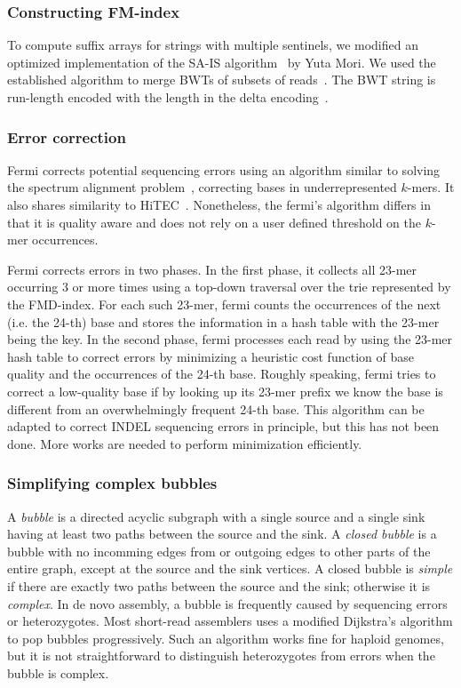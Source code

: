 \documentclass{bioinfo}
\begin{document}
\begin{methods}
\subsubsection{Constructing FM-index}
To compute suffix arrays for strings with multiple sentinels, we modified an
optimized implementation of the SA-IS algorithm~\citep{DBLP:journals/tc/NongZC11} by Yuta
Mori.  We used the established algorithm to merge BWTs of subsets of
reads~\citep{DBLP:journals/algorithmica/HonLSSY07,en:2009fk,DBLP:conf/latin/FerraginaGM10}.
The BWT string is run-length encoded with the length in the delta
encoding~\citep{Elias:1975ly}.

\subsubsection{Error correction}
Fermi corrects potential sequencing errors using an algorithm similar to
solving the spectrum alignment problem~\citep{Pevzner:2001vn}, correcting
bases in underrepresented $k$-mers. It also shares similarity to
HiTEC~\citep{Ilie:2011fk}. Nonetheless, the fermi's algorithm differs in that
it is quality aware and does not rely on a user defined threshold on the
$k$-mer occurrences.

Fermi corrects errors in two phases. In the first phase, it collects all 23-mer
occurring 3 or more times using a top-down traversal over the trie represented
by the FMD-index. For each such 23-mer, fermi counts the occurrences of
the next (i.e. the 24-th) base and stores the information in a hash table
with the 23-mer being the key. In the second phase, fermi processes each read
by using the 23-mer hash table to correct errors by minimizing a heuristic cost
function of base quality and the occurrences of the 24-th base. Roughly
speaking, fermi tries to correct a low-quality base if by looking up its 23-mer
prefix we know the base is different from an overwhelmingly frequent 24-th base.
This algorithm can be adapted to correct INDEL sequencing errors in principle,
but this has not been done. More works are needed to perform minimization efficiently.

\subsubsection{Simplifying complex bubbles}
A \emph{bubble} is a directed acyclic subgraph with a single source and a
single sink having at least two paths between the source and the sink. A
\emph{closed bubble} is a bubble with no incomming edges from or outgoing edges
to other parts of the entire graph, except at the source and the sink vertices.
A closed bubble is \emph{simple} if there are exactly two paths between the
source and the sink; otherwise it is \emph{complex}.  In de novo assembly, a
bubble is frequently caused by sequencing errors or heterozygotes. Most
short-read assemblers uses a modified Dijkstra's algorithm to pop bubbles
progressively. Such an algorithm works fine for haploid genomes, but it is not
straightforward to distinguish heterozygotes from errors when the bubble is
complex.


\end{methods}
\end{document}

